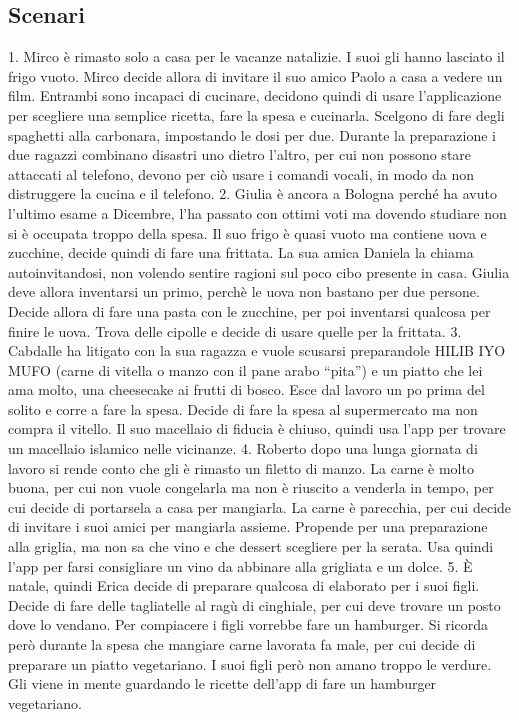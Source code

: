 \subsection{Scenari}
1. Mirco è rimasto solo a casa per le vacanze natalizie. I suoi gli hanno lasciato il frigo vuoto. Mirco decide allora di invitare il suo amico Paolo a casa a vedere un film. Entrambi sono incapaci di cucinare, decidono quindi di usare l’applicazione per scegliere una semplice ricetta, fare la spesa e cucinarla. Scelgono di fare degli spaghetti alla carbonara, impostando le dosi per due. Durante la preparazione i due ragazzi combinano disastri uno dietro l’altro, per cui non possono stare attaccati al telefono, devono per ciò usare i comandi vocali, in modo da non distruggere la cucina e il telefono.
2. Giulia è ancora a Bologna perché ha avuto l’ultimo esame a Dicembre, l’ha passato con ottimi voti ma dovendo studiare non si è occupata troppo della spesa. Il suo frigo è quasi vuoto ma contiene uova e zucchine, decide quindi di fare una frittata. La sua amica Daniela la chiama autoinvitandosi, non volendo sentire ragioni sul poco cibo presente in casa. Giulia deve allora inventarsi un primo, perchè le uova non bastano per due persone. Decide allora di fare una pasta con le zucchine, per poi inventarsi qualcosa per finire le uova. Trova delle cipolle e decide di usare quelle per la frittata.
3. Cabdalle ha litigato con la sua ragazza e vuole scusarsi preparandole HILIB IYO MUFO (carne di vitella o manzo con il pane arabo “pita”) e un piatto che lei ama molto, una cheesecake ai frutti di bosco. Esce dal lavoro un po prima del solito e corre a fare la spesa. Decide di fare la spesa al supermercato ma non compra il vitello. Il suo macellaio di fiducia è chiuso, quindi usa l’app per trovare un macellaio islamico nelle vicinanze. 
4. Roberto dopo una lunga giornata di lavoro si rende conto che gli è rimasto un filetto di manzo. La carne è molto buona, per cui non vuole congelarla ma non è riuscito a venderla in tempo, per cui decide di portarsela a casa per mangiarla.  La carne è parecchia, per cui decide di invitare i suoi amici per mangiarla assieme. Propende per una preparazione alla griglia, ma non sa che vino e che dessert scegliere per la serata. Usa quindi l’app per farsi consigliare un vino da abbinare alla grigliata e un dolce.
5. È natale, quindi Erica decide di preparare qualcosa di elaborato per i suoi figli. Decide di fare delle tagliatelle al ragù di cinghiale, per cui deve trovare un posto dove lo vendano. Per compiacere i figli vorrebbe fare un hamburger. Si ricorda però durante la spesa che mangiare carne lavorata fa male, per cui decide di preparare un piatto vegetariano. I suoi figli però non amano troppo le verdure. Gli viene in mente guardando le ricette dell’app di fare un hamburger vegetariano.
